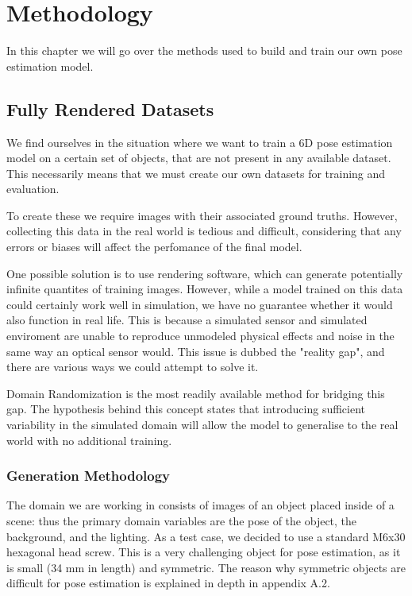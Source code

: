 \chapter{Methodology}

In this chapter we will go over the methods used to build and train our own pose estimation model.

\section{Fully Rendered Datasets}

We find ourselves in the situation where we want to train a 6D pose estimation model on a certain set of objects, that are not present in any available dataset. This necessarily means that we must create our own datasets for training and evaluation.

To create these we require images with their associated ground truths. However, collecting this data in the real world is tedious and difficult, considering that any errors or biases will affect the perfomance of the final model. 

One possible solution is to use rendering software, which can generate potentially infinite quantites of training images. However, while a model trained on this data could certainly work well in simulation, we have no guarantee whether it would also function in real life. This is because a simulated sensor and simulated enviroment are unable to reproduce unmodeled physical effects and noise in the same way an optical sensor would. This issue is dubbed the "reality gap"\cite{domainRandomization2}, and there are various ways we could attempt to solve it.

Domain Randomization\cite{domainRandomization} is the most readily available method for bridging this gap. The hypothesis behind this concept states that introducing sufficient variability in the simulated domain will allow the model to generalise to the real world with no additional training.

\subsection{Generation Methodology}

The domain we are working in consists of images of an object placed inside of a scene: thus the primary domain variables are the pose of the object, the background, and the lighting. As a test case, we decided to use a standard M6x30 hexagonal head screw. This is a very challenging object for pose estimation, as it is small (34 mm in length) and symmetric. The reason why symmetric objects are difficult for pose estimation is explained in depth in appendix A.2.

